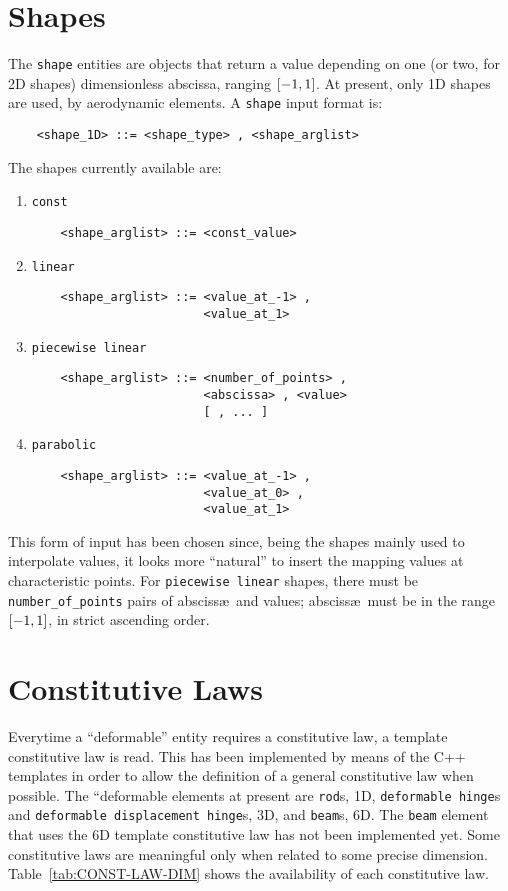 \section{Shapes}
The \texttt{shape} entities are objects that return a value depending on one
(or two, for 2D shapes) dimensionless abscissa, ranging $ \left[ -1,1 \right] $.
At present, only 1D shapes are used, by aerodynamic elements.
A \texttt{shape} input format is:
\begin{verbatim}
    <shape_1D> ::= <shape_type> , <shape_arglist>
\end{verbatim}
The shapes currently available are:
\begin{enumerate}
    \item \texttt{const}
    \begin{verbatim}
    <shape_arglist> ::= <const_value>
    \end{verbatim}
    \item \texttt{linear}
    \begin{verbatim}
    <shape_arglist> ::= <value_at_-1> , 
                        <value_at_1>
    \end{verbatim}
    \item \texttt{piecewise linear}
    \begin{verbatim}
    <shape_arglist> ::= <number_of_points> , 
                        <abscissa> , <value>
                        [ , ... ]
    \end{verbatim}
    \item \texttt{parabolic}
    \begin{verbatim}
    <shape_arglist> ::= <value_at_-1> , 
                        <value_at_0> , 
                        <value_at_1>
    \end{verbatim}
\end{enumerate}
This form of input has been chosen since, being the shapes mainly used to
interpolate values, it looks more ``natural'' to insert the mapping values
at characteristic points.
For \texttt{piecewise linear} shapes, there must be 
\texttt{number\_of\_points} pairs of absciss\ae\ and values; absciss\ae\
must be in the range $\left[ -1,1 \right]$, in strict ascending order.


\section{Constitutive Laws}
Everytime a ``deformable'' entity requires a constitutive law, a template
constitutive law is read. This has been implemented by means of the C++
templates in order to allow the definition of a general constitutive law
when possible. The ``deformable elements at present are \texttt{rod}s, 1D,
\texttt{deformable hinge}s and \texttt{deformable displacement hinge}s, 3D,  
and \texttt{beam}s, 6D.
The \texttt{beam} element that uses the 6D template constitutive law has not been
implemented yet.
Some constitutive laws are meaningful only when related to some precise
dimension. 
Table~\ref{tab:CONST-LAW-DIM} shows the availability of each constitutive law.

